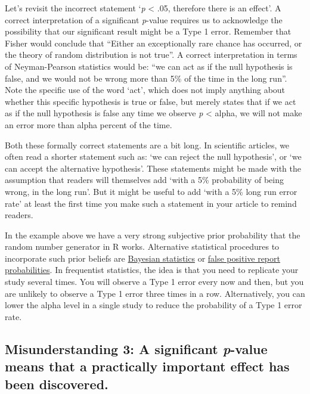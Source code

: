 \documentclass[
  oneside]{krantz}
\begin{document}
Let's revisit the incorrect statement `\emph{p} \textless{} .05, therefore there is an effect'. A correct interpretation of a significant \emph{p}-value requires us to acknowledge the possibility that our significant result might be a Type 1 error. Remember that Fisher would conclude that ``Either an exceptionally rare chance has occurred, or the theory of random distribution is not true''. A correct interpretation in terms of Neyman-Pearson statistics would be: ``we can act as if the null hypothesis is false, and we would not be wrong more than 5\% of the time in the long run''. Note the specific use of the word `act', which does not imply anything about whether this specific hypothesis is true or false, but merely states that if we act as if the null hypothesis is false any time we observe \emph{p} \textless{} alpha, we will not make an error more than alpha percent of the time.

Both these formally correct statements are a bit long. In scientific articles, we often read a shorter statement such as: `we can reject the null hypothesis', or `we can accept the alternative hypothesis'. These statements might be made with the assumption that readers will themselves add `with a 5\% probability of being wrong, in the long run'. But it might be useful to add `with a 5\% long run error rate' at least the first time you make such a statement in your article to remind readers.

In the example above we have a very strong subjective prior probability that the random number generator in R works. Alternative statistical procedures to incorporate such prior beliefs are \protect\hyperlink{bayes}{Bayesian statistics} or \protect\hyperlink{ppv}{false positive report probabilities}. In frequentist statistics, the idea is that you need to replicate your study several times. You will observe a Type 1 error every now and then, but you are unlikely to observe a Type 1 error three times in a row. Alternatively, you can lower the alpha level in a single study to reduce the probability of a Type 1 error rate.

\hypertarget{misunderstanding-3-a-significant-p-value-means-that-a-practically-important-effect-has-been-discovered.}{%
\subsection{\texorpdfstring{Misunderstanding 3: A significant \emph{p}-value means that a practically important effect has been discovered.}{Misunderstanding 3: A significant p-value means that a practically important effect has been discovered.}}\label{misunderstanding-3-a-significant-p-value-means-that-a-practically-important-effect-has-been-discovered.}}
\end{document}

